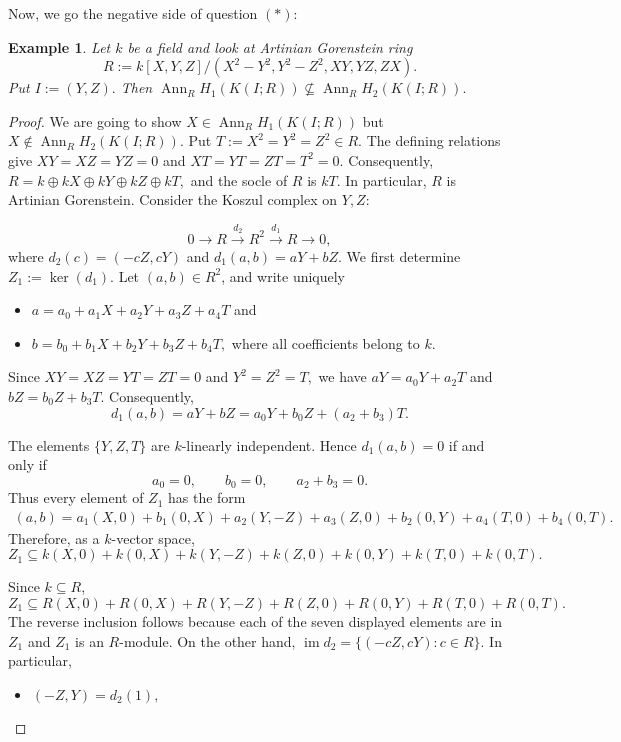 \documentclass[11pt,a4paper]{amsart}
\numberwithin{equation}{section}
\newtheorem{example}[theorem]{Example}
\DeclareMathOperator{\Ann}{Ann}\DeclareMathOperator{\ann}{Ann}
\begin{document}
Now, we go the negative side of question $(\ast)$:
\begin{example}\label{e215}
	Let $k$ be a field and look at 
	Artinian Gorenstein ring
	$$
	R:=k[X,Y,Z]/(X^2-Y^2,Y^2-Z^2,XY,YZ,ZX).
	$$ Put
	$I:=(Y,Z).$ 
	Then
	$\Ann_R H_1(K(I;R))\nsubseteq
	\Ann_R H_2(K(I;R)). $
	
	
\end{example}

\begin{proof}  We are going to show
	$ X\in \Ann_R H_1(K(I;R))$
	{but} 
	$X\notin\Ann_R H_2(K(I;R)). $ 
	Put
	$T:=X^2=Y^2=Z^2\in R.$
	The defining relations give
	$XY=XZ=YZ=0$
	and
	$XT=YT=ZT=T^2=0.$ 
	Consequently,
	$R=k\oplus kX\oplus kY\oplus kZ\oplus kT,$
	and the socle of $R$ is $kT$. In particular, $R$ is Artinian
	Gorenstein.
	Consider the Koszul complex on $Y,Z$:
	
	$$
	0\longrightarrow R
	\xrightarrow{d_2} R^2
	\xrightarrow{d_1} R
	\longrightarrow0,
	$$
	where
	$d_2(c)=(-cZ,cY)$  {and} 
	$d_1(a,b)=aY+bZ.$
	We first determine \(Z_1:=\ker(d_1)\).
	Let \((a,b)\in R^2\), and write uniquely
	\begin{itemize}
		\item $
		a=a_0+a_1X+a_2Y+a_3Z+a_4T$ and
		
		\item $
		b=b_0+b_1X+b_2Y+b_3Z+b_4T,$ 
		where all coefficients belong to \(k\).
	\end{itemize}	
	
	Since
	\(XY=XZ=YT=ZT=0\)
	and
	\(Y^2=Z^2=T,\)
	we have
	\(aY=a_0Y+a_2T\)
	and
	\(bZ=b_0Z+b_3T.\)
	Consequently,
	\[
	d_1(a,b)
	=aY+bZ
	=a_0Y+b_0Z+(a_2+b_3)T.
	\]
	
	The elements $\{Y,Z,T\}$ are \(k\)-linearly independent. Hence
	\(d_1(a,b)=0\)
	if and only if
	\[
	a_0=0,\qquad b_0=0,\qquad a_2+b_3=0.
	\]
	Thus every element of \(Z_1\) has the form
	\[
	\begin{aligned}
	(a,b)
	={}a_1(X,0)+b_1(0,X)
	+a_2(Y,-Z) 
	+a_3(Z,0)+b_2(0,Y)
	+a_4(T,0)+b_4(0,T).
	\end{aligned}
	\]
	Therefore, as a \(k\)-vector space,
	\[
	Z_1\subseteq
	k(X,0)+k(0,X)+k(Y,-Z)+k(Z,0)+k(0,Y)
	+k(T,0)+k(0,T).
	\]
	
	Since \(k\subseteq R\), 
	\[
	Z_1\subseteq
	R(X,0)+R(0,X)+R(Y,-Z)+R(Z,0)+R(0,Y)+R(T,0)+R(0,T).
	\]
	The reverse inclusion follows because each of the seven displayed elements are in \(Z_1\) and \(Z_1\) is an  $R$-module.
	On the other hand,
	$
	\operatorname{im}d_2
	=\{(-cZ,cY):c\in R\}.
	$ In particular,
	\begin{itemize}
		\item $
		(-Z,Y)=d_2(1),
		$
		

\end{itemize}
\end{proof}
\end{document}
